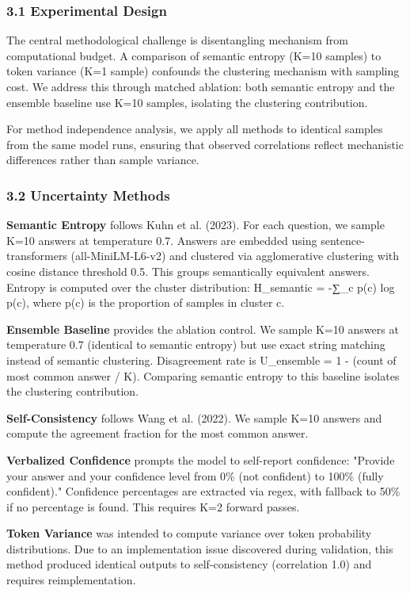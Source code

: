 
\subsubsection{3.1 Experimental Design}

The central methodological challenge is disentangling mechanism from computational budget. A comparison of semantic entropy (K=10 samples) to token variance (K=1 sample) confounds the clustering mechanism with sampling cost. We address this through matched ablation: both semantic entropy and the ensemble baseline use K=10 samples, isolating the clustering contribution.

For method independence analysis, we apply all methods to identical samples from the same model runs, ensuring that observed correlations reflect mechanistic differences rather than sample variance.

\subsubsection{3.2 Uncertainty Methods}

\textbf{Semantic Entropy} follows Kuhn et al. (2023). For each question, we sample K=10 answers at temperature 0.7. Answers are embedded using sentence-transformers (all-MiniLM-L6-v2) and clustered via agglomerative clustering with cosine distance threshold 0.5. This groups semantically equivalent answers. Entropy is computed over the cluster distribution: H_semantic = -∑_c p(c) log p(c), where p(c) is the proportion of samples in cluster c.

\textbf{Ensemble Baseline} provides the ablation control. We sample K=10 answers at temperature 0.7 (identical to semantic entropy) but use exact string matching instead of semantic clustering. Disagreement rate is U_ensemble = 1 - (count of most common answer / K). Comparing semantic entropy to this baseline isolates the clustering contribution.

\textbf{Self-Consistency} follows Wang et al. (2022). We sample K=10 answers and compute the agreement fraction for the most common answer.

\textbf{Verbalized Confidence} prompts the model to self-report confidence: "Provide your answer and your confidence level from 0\% (not confident) to 100\% (fully confident)." Confidence percentages are extracted via regex, with fallback to 50\% if no percentage is found. This requires K=2 forward passes.

\textbf{Token Variance} was intended to compute variance over token probability distributions. Due to an implementation issue discovered during validation, this method produced identical outputs to self-consistency (correlation 1.0) and requires reimplementation.

